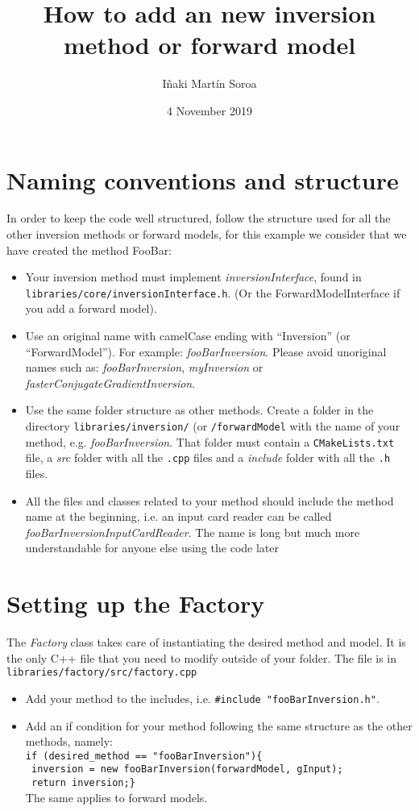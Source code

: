 \documentclass{article}
\title{How to add an new inversion method or forward model}
\author{I\~naki Mart\'in Soroa }
\date{4 November 2019}
\begin{document}
\maketitle

\section{Naming conventions and structure}
In order to keep the code well structured, follow the structure used for all the other inversion methods or forward models, for this example we consider that we have created the method FooBar:
\begin{itemize}
    \item Your inversion method must implement \textit{inversionInterface}, found in\\ \texttt{libraries/core/inversionInterface.h}. (Or the ForwardModelInterface if you add a forward model).
    \item Use an original name with camelCase ending with ``Inversion'' (or ``ForwardModel''). For example: \textit{fooBarInversion}. Please avoid unoriginal names such as: \textit{fooBarInversion}, \textit{myInversion} or \textit{fasterConjugateGradientInversion}.
    \item Use the same folder structure as other methods. Create a folder in the directory \texttt{libraries/inversion/} (or \texttt{/forwardModel} with the name of your method, e.g. \textit{fooBarInversion}. That folder must contain a \texttt{CMakeLists.txt} file, a \textit{src} folder with all the \texttt{.cpp} files and a \textit{include} folder with all the \texttt{.h} files.
    \item All the files and classes related to your method should include the method name at the beginning, i.e. an input card reader can be called \textit{fooBarInversionInputCardReader}. The name is long but much more understandable for anyone else using the code later
\end{itemize}

\section{Setting up the Factory}
The \textit{Factory} class takes care of instantiating the desired method and model. It is the only C++ file that you need to modify outside of your folder. The file is in\\ \texttt{libraries/factory/src/factory.cpp}
\begin{itemize}
    \item Add your method to the includes, i.e. \texttt{\#include "fooBarInversion.h"}.
    \item Add an if condition for your method following the same structure as the other methods, namely:\\\texttt{if (desired\_method == "fooBarInversion")\{}\\\texttt{    inversion = new fooBarInversion(forwardModel, gInput);}\\\texttt{    return inversion;\}}\\ The same applies to forward models.
\end{itemize}
\end{document}
